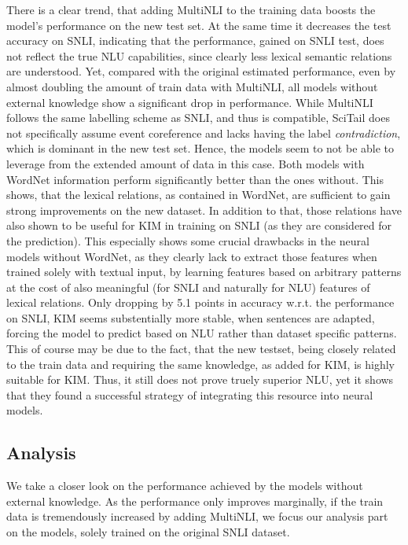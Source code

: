 There is a clear trend, that adding \ac{MultiNLI} to the training data boosts the model's performance on the new test set. At the same time it decreases the test accuracy on SNLI, indicating that the performance, gained on \ac{SNLI} test, does not reflect the true \ac{NLU} capabilities, since clearly less lexical semantic relations are understood. Yet, compared with the original estimated performance, even by almost doubling the amount of train data with \ac{MultiNLI}, all models without external knowledge show a significant drop in performance. While MultiNLI follows the same labelling scheme as SNLI, and thus is compatible, SciTail does not specifically assume event coreference and lacks having the label \textit{contradiction}, which is dominant in the new test set. Hence, the models seem to not be able to leverage from the extended amount of data in this case. Both models with WordNet information perform significantly better than the ones without. This shows, that the lexical relations, as contained in WordNet, are sufficient to gain strong improvements on the new dataset. In addition to that, those relations have also shown to be useful for \ac{KIM} in training on \ac{SNLI} (as they are considered for the prediction). This especially shows some crucial drawbacks in the neural models without WordNet, as they clearly lack to extract those features when trained solely with textual input, by learning features based on arbitrary patterns at the cost of also meaningful (for \ac{SNLI} and naturally for \ac{NLU}) features of lexical relations. Only dropping by 5.1 points in accuracy w.r.t. the performance on \ac{SNLI}, \ac{KIM} seems substentially more stable, when sentences are adapted, forcing the model to predict based on \ac{NLU} rather than dataset specific patterns. This of course may be due to the fact, that the new testset, being closely related to the train data and requiring the same knowledge, as added for \ac{KIM}, is highly suitable for \ac{KIM}. Thus, it still does not prove truely superior \ac{NLU}, yet it shows that they found a successful strategy of integrating this resource into neural models.

\subsection{Analysis}
We take a closer look on the performance achieved by the models without external knowledge. As the performance only improves marginally, if the train data is tremendously increased by adding \ac{MultiNLI}, we focus our analysis part on the models, solely trained on the original \ac{SNLI} dataset.
